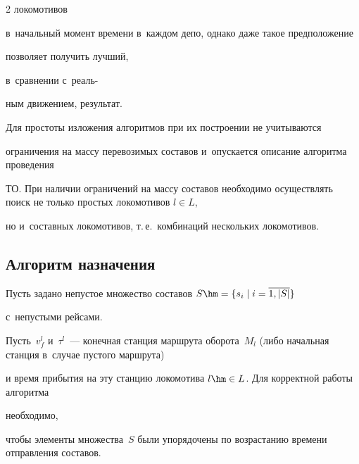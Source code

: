 \begin{multicols}{2}
локомотивов


в~начальный момент времени в~каждом депо, однако даже такое предположение 


позволяет получить лучший,


в~сравнении с~реаль-\linebreak\vspace*{-12pt}





\pagebreak





\noindent


ным движением, результат.


Для простоты изложения алгоритмов при их построении не учитываются 


ограничения на массу перевозимых составов и~опускается описание алгоритма проведения 


ТО. При наличии ограничений на массу составов необходимо осуществлять поиск не только простых локомотивов $l\in L$,


но и~составных локомотивов, т.\,е.\ комбинаций нескольких локомотивов.





\vspace*{-6pt}


    


\subsection{Алгоритм назначения} \label{find1}





\vspace*{-2pt}


    


Пусть задано непустое множество составов $S \hm= \{s_i\mid i = \overline{1, |S|}\}$ 


с~непустыми рейсами.


Пусть~$v^l_f$ и~$\tau^l$~--- конечная станция маршрута оборота~$M_l$ (либо начальная станция в~случае пустого маршрута)


и время прибытия на эту станцию локомотива $l\hm\in L$. Для корректной работы алгоритма 


необходимо,


чтобы элементы множества~$S$ были упорядочены по возрастанию времени отправления составов.



\end{multicols}

